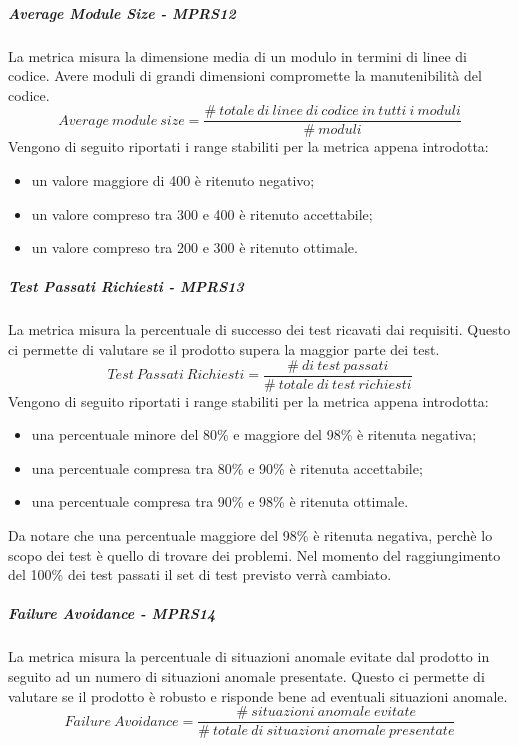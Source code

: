 \documentclass[../PianoDiQualifica.tex]{subfiles}
\begin{document}
			\subparagraph{Average Module Size - MPRS12}\label{MPRS12}
			La metrica misura la dimensione media di un modulo in termini di linee di codice. Avere moduli di grandi dimensioni compromette la manutenibilità del codice.
			\begin{equation}
			Average \ module \ size  = \frac{\# \ totale \ di \ linee \ di \ codice \ in \ tutti \ i \ moduli  }{\#\ moduli}
			\end{equation}
			Vengono di seguito riportati i range stabiliti per la metrica appena introdotta:
			\begin{itemize}
				\item un valore maggiore di 400 è ritenuto negativo;
				\item un valore compreso tra 300 e 400 è ritenuto accettabile;
				\item un valore compreso tra 200 e 300 è ritenuto ottimale.
			\end{itemize}
			\subparagraph{Test Passati Richiesti - MPRS13}\label{MPRS13}
			La metrica misura la percentuale di successo dei test ricavati dai requisiti. Questo ci permette di valutare se il prodotto supera la maggior parte dei test.
			\begin{equation}
			Test \ Passati \ Richiesti  = \frac{\# \ di \ test \ passati }{\#\ totale \ di \ test \ richiesti}
			\end{equation}
			Vengono di seguito riportati i range stabiliti per la metrica appena introdotta:
			\begin{itemize}
				\item una percentuale minore del 80\% e maggiore del 98\% è ritenuta negativa;
				\item una percentuale compresa tra 80\% e 90\% è ritenuta accettabile;
				\item una percentuale compresa tra 90\% e 98\% è ritenuta ottimale.
			\end{itemize}
			Da notare che una percentuale maggiore del 98\% è ritenuta negativa, perchè lo scopo dei test è quello di trovare dei problemi. Nel momento del raggiungimento del 100\% dei test passati il set di test previsto verrà cambiato. 
			\subparagraph{Failure Avoidance - MPRS14}\label{MPRS14}
			La metrica misura la percentuale di situazioni anomale evitate dal prodotto in seguito ad un numero di situazioni anomale presentate. Questo ci permette di valutare se il prodotto è robusto e risponde bene ad eventuali situazioni anomale. 
			\begin{equation}
			Failure \ Avoidance  = \frac{\#\ situazioni \ anomale \ evitate }{\#\ totale \ di \ situazioni \ anomale \ presentate }
			\end{equation}
\end{document}
